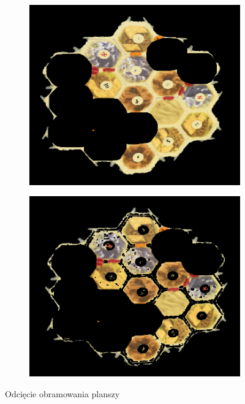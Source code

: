 \documentclass[a4paper]{article}
\begin{document}
	\begin{figure}[H]
        \begin{subfigure}[]{.5\linewidth}
        \includegraphics[width=\linewidth]{pictures/fields/pre_cut.png}

        \end{subfigure}
        \begin{subfigure}[]{0.5\linewidth}
        \includegraphics[width=\linewidth]{pictures/fields/after_cut.png}
        \end{subfigure}

        \caption{Odcięcie obramowania planszy}
        \label{fig:step5}
    \end{figure}
	
\end{document}
